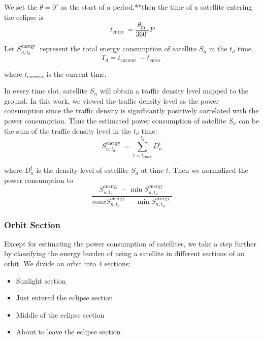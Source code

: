 We set the $\theta = 0^{\circ}$ as the start of a period,**then the time of a satellite entering the eclipse is 
\begin{equation}
 t_{\text {enter }}=\frac{\theta_{\text {in }}}{360^{\circ}} P 
 \label{eq:ENTERINGTIME}
\end{equation}

Let $S_{n,t_{d}}^{\text {energy }}$ represent the total energy consumption of satellite $S_n$ in the $t_{d}$ time.
\begin{equation}
 T_{d}=t_{\text {current }}-t_{\text {enter }} 
\end{equation}

where $t_{current}$ is the current time.

In every time slot, satellite $S_n$ will obtain a traffic density level mapped to the ground. In this work, we viewed the traffic density level as the power consumption since the traffic density is significantly positively correlated with the power consumption. Thus the estimated power consumption of satellite $S_n$ can be the sum of the traffic density level in the $t_{d}$ time:
\begin{equation}
 S_{n, t_{d}}^{\text {energy }}=\sum_{t=t_{e n t e r}}^{t_{d}} D_{n}^{t} 
\label{eq:ENERGYCONSUMPTION}
\end{equation}

where $D_n^t$ is the density level of satellite $S_n$ at time $t$.
Then we normalized the power consumption to
\begin{equation}
  \frac{S_{n, t_{d}}^{\text {energy }}-\min S_{n,t_{d}}^{\text {energy }}}{maxS_{n,t_{d}}^{\text {energy }}-\min S_{n,t_{d}}^{\text {energy }}}
\label{eq:ENERGYCONSUMPTION}
\end{equation}

\subsubsection{Orbit Section}
Except for estimating the power consumption of satellites, we take a step further by classifying the energy burden of using a satellite in different sections of an orbit.
We divide an orbit into 4 sections:

\begin{itemize}
  \item Sunlight section
  \item Just entered the eclipse section
  \item Middle of the eclipse section
  \item About to leave the eclipse section
\end{itemize}

